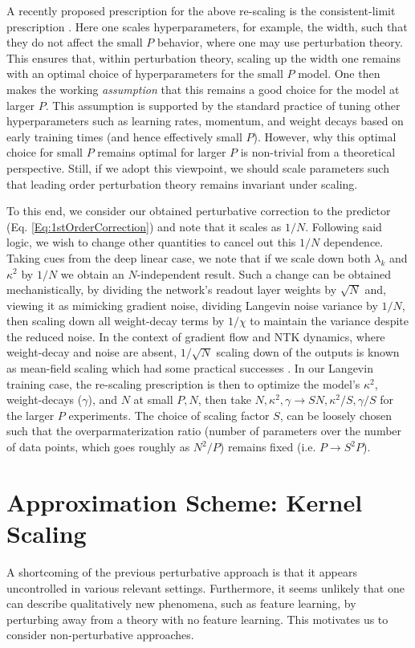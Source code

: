 A recently proposed prescription for the above re-scaling is the consistent-limit prescription \citep{yang2022tensorprogramsvtuning,bordelon2023depthwise}. Here one scales hyperparameters, for example, the width, such that they do not affect the small $P$ behavior, where one may use perturbation theory. This ensures that, within perturbation theory, scaling up the width one remains with an optimal choice of hyperparameters for the small $P$ model. One then makes the working {\it assumption} that this remains a good choice for the model at larger $P$. This assumption is supported by the standard practice of tuning other hyperparameters such as learning rates, momentum, and weight decays based on early training times (and hence effectively small $ P $). However, why this optimal choice for small $P$ remains optimal for larger $P$ is non-trivial from a theoretical perspective. Still, if we adopt this viewpoint, we should scale parameters such that leading order perturbation theory remains invariant under scaling.

To this end, we consider our obtained perturbative correction to the predictor (Eq. \ref{Eq:1stOrderCorrection}) and note that it scales as $1/N$. Following said logic, we wish to change other quantities to cancel out this $1/N$ dependence. Taking cues from the deep linear case, we note that if we scale down both $\lambda_k$ and $\kappa^2$ by $1/N$ we obtain an $N$-independent result. Such a change can be obtained mechanistically, by dividing the network's readout layer weights by $\sqrt{N}$ and, viewing it as mimicking gradient noise, dividing Langevin noise variance by $1/N$, then scaling down all weight-decay terms by $1/\chi$ to maintain the variance despite the reduced noise. In the context of gradient flow and NTK dynamics, where weight-decay and noise are absent, $1/\sqrt{N}$ scaling down of the outputs is known as mean-field scaling which had some practical successes \citep{yang2022tensorprogramsvtuning,dinan2023effectivetheorytransformersinitialization}. In our Langevin training case, the re-scaling prescription is then to optimize the model's $\kappa^2$, weight-decays ($\gamma$), and $N$ at small $P,N$, then take $N,\kappa^2,\gamma \rightarrow SN,\kappa^2/S,\gamma/S$ for the larger $P$ experiments. The choice of scaling factor $S$, can be loosely chosen such that the overparmaterization ratio (number of parameters over the number of data points, which goes roughly as $N^2/P$) remains fixed (i.e. $P\rightarrow S^2 P$).    


\section{Approximation Scheme: Kernel Scaling}
A shortcoming of the previous perturbative approach is that it appears uncontrolled in various relevant settings. Furthermore, it seems unlikely that one can describe qualitatively new phenomena, such as feature learning, by perturbing away from a theory with no feature learning. This motivates us to consider non-perturbative approaches. 

